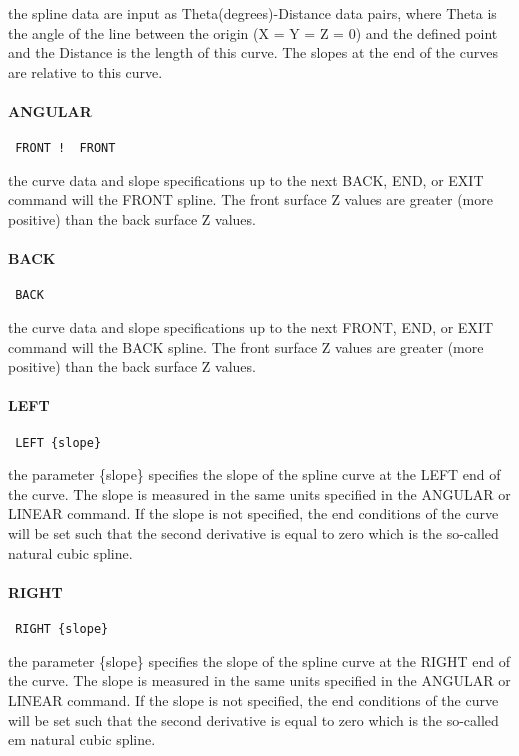 the spline data are input as Theta(degrees)-Distance data pairs, where
Theta is the angle of the line between the origin (X = Y = Z = 0) and
the defined point and the Distance is the length of this curve.  The
slopes at the end of the curves are relative to this curve.
\paragraph{ANGULAR}
\begin{verbatim}
 FRONT !  FRONT
\end{verbatim}

the curve data and slope specifications up to the next BACK, END, or
EXIT command will  the FRONT spline.  The front surface Z
values are greater (more positive) than the back surface Z values.
\paragraph{BACK}
\begin{verbatim}
 BACK
\end{verbatim}

the curve data and slope specifications up to the next FRONT, END, or
EXIT command will  the BACK spline.  The front surface Z
values are greater (more positive) than the back surface Z values.
\paragraph{LEFT}
\begin{verbatim}
 LEFT {slope}
\end{verbatim}

the parameter \{slope\} specifies the slope of the spline curve at the
LEFT end of the curve.  The slope is measured in the same units
specified in the ANGULAR or LINEAR command.  If the slope is not
specified, the end conditions of the curve will be set such that the
second derivative is equal to zero which is the so-called natural
cubic spline.
\paragraph{RIGHT}
\begin{verbatim}
 RIGHT {slope}
\end{verbatim}

the parameter \{slope\} specifies the slope of the spline curve at the
RIGHT end of the curve.  The slope is measured in the same units
specified in the ANGULAR or LINEAR command.  If the slope is not
specified, the end conditions of the curve will be set such that the
second derivative is equal to zero which is the so-called em natural
cubic spline.

